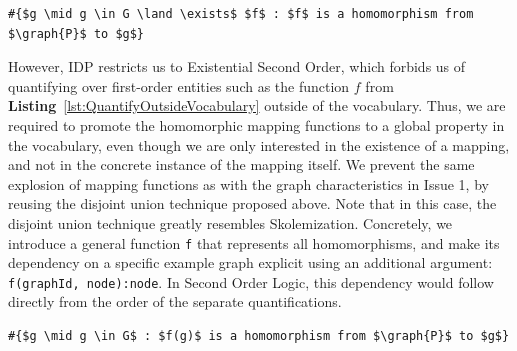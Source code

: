 \begin{center}
\begin{minipage}{0.64\linewidth}
\begin{lstlisting}[mathescape, caption=Quantifying over functions outside the vocabulary, label=lst:QuantifyOutsideVocabulary]
#{$g \mid g \in G \land \exists$ $f$ : $f$ is a homomorphism from $\graph{P}$ to $g$}
\end{lstlisting}
\end{minipage}
\end{center}
However, IDP restricts us to Existential Second Order, which forbids us of quantifying over first-order entities such as the function $f$ from \textbf{Listing}~\ref{lst:QuantifyOutsideVocabulary} outside of the vocabulary.
Thus, we are required to promote the homomorphic mapping functions to a global property in the vocabulary, even though we are only interested in the existence of a mapping, and not in the concrete instance of the mapping itself.
We prevent the same explosion of mapping functions as with the graph characteristics in Issue 1, by reusing the disjoint union technique proposed above. 
Note that in this case, the disjoint union technique greatly resembles Skolemization.
Concretely, we introduce a general function \verb|f| that represents all homomorphisms, and make its dependency on a specific example graph explicit using an additional argument:
\verb|f(graphId, node):node|.
In Second Order Logic, this dependency would follow directly from the order of the separate quantifications.

\begin{center}
\begin{minipage}{0.54\linewidth}
\begin{lstlisting}[mathescape, caption=Globalized existential functions, label=lst:GlobalizeExistentialQuantifications]
#{$g \mid g \in G$ : $f(g)$ is a homomorphism from $\graph{P}$ to $g$}
\end{lstlisting}
\end{minipage}
\end{center}

